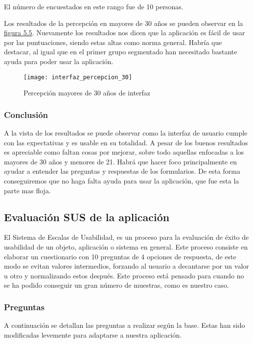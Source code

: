 El número de encuestados en este rango fue de 10 personas.

Los resultados de la percepción en mayores de 30 años se pueden observar en la \hyperref[fig:Percepción mayores de 30 años de interfaz]{figura 5.5}.
Nuevamente los resultados nos dicen que la aplicación es fácil de usar por las puntuaciones,
siendo estas altas como norma general. Habría que destacar, al igual que en el primer grupo segmentado
han necesitado bastante ayuda para poder usar la aplicación.

\begin{figure}[htb]
  \centering
  \texttt{[image: interfaz\_percepcion\_30]}
  \caption[Percepción mayores de 30 años de interfaz]{Percepción mayores de 30 años de interfaz}
  \label{fig:Percepción mayores de 30 años de interfaz}
\end{figure}

\subsubsection{Conclusión}
A la vista de los resultados se puede observar como la interfaz de usuario cumple
con las expectativas y es usable en su totalidad. A pesar de los buenos resultados
es apreciable como faltan cosas por mejorar, sobre todo aquellas enfocadas a los
mayores de 30 años y menores de 21. Habrá que hacer foco principalmente en
ayudar a entender las preguntas y respuestas de los formularios. De esta forma
conseguiremos que no haga falta ayuda para usar la aplicación, que fue esta
la parte mas floja.

\subsection{Evaluación SUS de la aplicación}
El Sistema de Escalas de Usabilidad\cite{sus}, es un proceso para la evaluación de éxito
de usabilidad de un objeto, aplicación o sistema en general. Este proceso consiste
en elaborar un cuestionario con 10 preguntas de 4 opciones de respuesta, de este modo
se evitan valores intermedios, forzando al usuario a decantarse por un valor u otro y
normalizando estos después. Este proceso está pensado para cuando no se ha podido
conseguir un gran número de muestras, como es nuestro caso.

\subsubsection{Preguntas}
A continuación se detallan las preguntas a realizar según la base. Estas han sido modificadas
levemente para adaptarse a nuestra aplicación.

